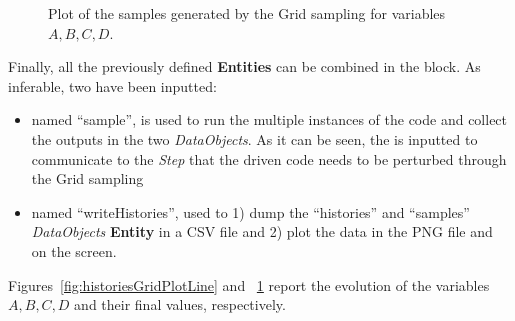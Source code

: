 \begin{enumerate}
\begin{figure}[h!]
  \caption{Plot of the samples generated by the Grid sampling for variables $A,B,C,D$.}
  \label{fig:samplesGridPlotLine}
 \end{figure}
   Finally, all the previously defined \textbf{Entities} can be combined in
   the  block. As inferable,
   two  have been inputted:
   \begin{itemize}
     \item {} named ``sample'', is used to run the multiple
     instances of the code and
     collect the outputs in the two \textit{DataObjects}. As it can be
     seen, the  is inputted to communicate to the
     \textit{Step} that the driven code needs to
     be perturbed through the Grid sampling
     \item  {} named ``writeHistories'', used to 1) dump
     the ``histories'' and ``samples'' \textit{DataObjects}
     \textbf{Entity} in a CSV file and 2) plot the data in the PNG file and
     on the screen.
   \end{itemize}
\end{enumerate}
 Figures~\ref{fig:historiesGridPlotLine} and ~\ref{fig:samplesGridPlotLine}  report the evolution of the
 variables $A,B,C,D$ and their final values, respectively.

